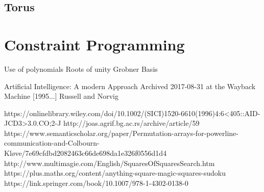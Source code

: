 \documentclass[a4paper,12pt]{article}
\begin{document}
	\subsection{Torus}
\section{Constraint Programming}
	Use of polynomials
	Roots of unity
	Grobner Basis

\begin{thebibliography}{100}
	 Artificial Intelligence: A modern Approach Archived 2017-08-31 at the Wayback Machine [1995...] Russell and Norvig

	 https://onlinelibrary.wiley.com/doi/10.1002/(SICI)1520-6610(1996)4:6<405::AID-JCD3>3.0.CO;2-J
	 http://joas.agrif.bg.ac.rs/archive/article/59
	 https://www.semanticscholar.org/paper/Permutation-arrays-for-powerline-communication-and-Colbourn-Kløve/7e69cfdbd2082463c66de698da1e326f0556d1d4
	 http://www.multimagie.com/English/SquaresOfSquaresSearch.htm
	 https://plus.maths.org/content/anything-square-magic-squares-sudoku
	 https://link.springer.com/book/10.1007/978-1-4302-0138-0
\end{thebibliography}
\end{document}
